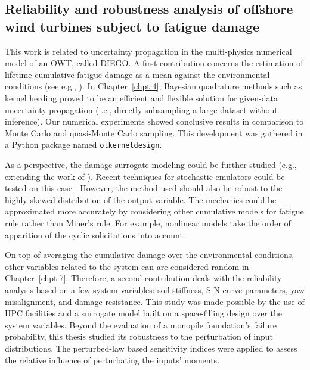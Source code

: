 \subsection*{Reliability and robustness analysis of offshore wind turbines subject to fatigue damage}

This work is related to uncertainty propagation in the multi-physics numerical model of an OWT, called DIEGO. 
A first contribution concerns the estimation of lifetime cumulative fatigue damage as a mean against the environmental conditions (see e.g., \citealp{muller_cheng_2018}). 
In Chapter~\ref{chpt:4}, Bayesian quadrature methods such as kernel herding \citep{chen_welling_2010,husar_duvenaud_2012} proved to be an efficient and flexible solution for given-data uncertainty propagation (i.e., directly subsampling a large dataset without inference). 
Our numerical experiments showed conclusive results in comparison to Monte Carlo and quasi-Monte Carlo sampling. 
This development was gathered in a Python package named \texttt{otkerneldesign}. 

As a perspective, the damage surrogate modeling could be further studied (e.g., extending the work of \citealp{slot_sorensen_2020}). 
Recent techniques for stochastic emulators could be tested on this case \citep{baker_2022_stochastic_surrogates_review,zhu_2023_stochastic_pce,luthen_2023_stochastic_pce}.
However, the method used should also be robust to the highly skewed distribution of the output variable. 
The mechanics could be approximated more accurately by considering other cumulative models for fatigue rule rather than Miner's rule. 
For example, nonlinear models \citep{rocher_2020_nonlinear_fatigue} take the order of apparition of the cyclic solicitations into account.  

On top of averaging the cumulative damage over the environmental conditions, other variables related to the system can are considered random in Chapter~\ref{chpt:7}. 
Therefore, a second contribution deals with the reliability analysis based on a few system variables: soil stiffness, S-N curve parameters, yaw misalignment, and damage resistance.   
This study was made possible by the use of HPC facilities and a surrogate model built on a space-filling design over the system variables. 
Beyond the evaluation of a monopile foundation's failure probability, this thesis studied its robustness to the perturbation of input distributions.  
The perturbed-law based sensitivity indices \citep{lemaitre_2015_PLI} were applied to assess the relative influence of perturbating the inputs' moments. 

